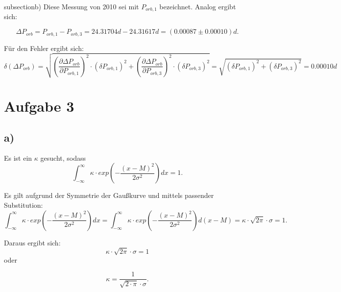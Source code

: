 \documentclass[titlepage]{scrartcl}
\begin{document}
subsection{b)}
Diese Messung von 2010 sei mit $P_{orb, 1}$ bezeichnet. 
Analog ergibt sich: 

\begin{equation}
\Delta P_{orb} = P_{orb, 1} - P_{orb, 3} = 24.31704 d - 24.31617 d = (0.00087 \pm 0.00010) d.
\end{equation}

Für den Fehler ergibt sich: 
\begin{equation}
\delta (\Delta P_{orb}) = \sqrt{(\frac{\partial \Delta P_{orb}}{\partial P_{orb, 1}})^2 \cdot (\delta P_{orb, 1})^2 + (\frac{\partial \Delta P_{orb}}{\partial P_{orb, 3}})^2 \cdot (\delta P_{orb, 3})^2} = \sqrt{(\delta P_{orb, 1})^2 + (\delta P_{orb, 3})^2} = 0.00010 d
\end{equation}

\section{Aufgabe 3}
\subsection{a)}
Es ist ein $\kappa$ gesucht, sodass
\begin{equation}
\int_{-\infty}^{\infty} \kappa \cdot exp(-\frac{(x-M)^2}{2\sigma^2}) dx = 1.
\end{equation}

Es gilt aufgrund der Symmetrie der Gaußkurve und mittels passender Substitution:
\begin{equation}
\int_{-\infty} ^{\infty} \kappa \cdot exp(-\frac{(x-M)^2}{2\sigma^2}) dx = \int_{-\infty} ^{\infty} \kappa \cdot exp(-\frac{(x-M)^2}{2\sigma^2}) d(x-M) = \kappa \cdot \sqrt {2\pi} \cdot \sigma = 1. 
\end{equation}

Daraus ergibt sich: 
\begin{equation}
\kappa \cdot \sqrt{2\pi} \cdot \sigma = 1
\end{equation} oder


\begin{equation}
\kappa = \frac{1}{\sqrt{2\cdot \pi} \cdot \sigma}.
\end{equation}
\end{document}
